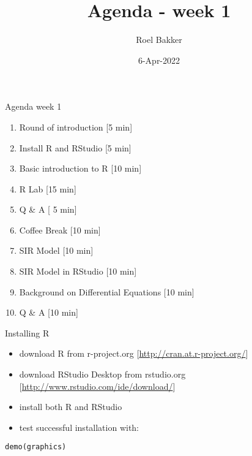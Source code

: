 \documentclass[
  ignorenonframetext,
]{beamer}
\title{Agenda - week 1}
\author{Roel Bakker}
\date{6-Apr-2022}
\providecommand{\tightlist}{%
  \setlength{\itemsep}{0pt}\setlength{\parskip}{0pt}}
\begin{document}
\frame{\titlepage}

\begin{frame}{Agenda week 1}
\protect\hypertarget{agenda-week-1}{}
\begin{enumerate}
\tightlist
\item
  Round of introduction {[}5 min{]}
\item
  Install R and RStudio {[}5 min{]}
\item
  Basic introduction to R {[}10 min{]}
\item
  R Lab {[}15 min{]}
\item
  Q \& A {[} 5 min{]}
\item
  Coffee Break {[}10 min{]}
\item
  SIR Model {[}10 min{]}
\item
  SIR Model in RStudio {[}10 min{]}
\item
  Background on Differential Equations {[}10 min{]}
\item
  Q \& A {[}10 min{]}
\end{enumerate}
\end{frame}

\begin{frame}[fragile]{Installing R}
\protect\hypertarget{installing-r}{}
\begin{itemize}
\tightlist
\item
  download R from r-project.org
  {[}\url{http://cran.at.r-project.org/}{]}
\item
  download RStudio Desktop from rstudio.org
  {[}\url{http://www.rstudio.com/ide/download/}{]}
\item
  install both R and RStudio
\item
  test successful installation with:
\end{itemize}

\begin{verbatim}
demo(graphics)
\end{verbatim}
\end{frame}
\end{document}
